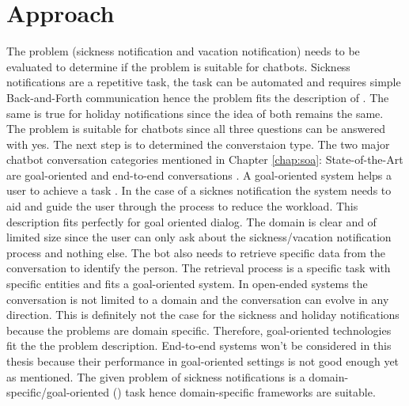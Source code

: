 
\section{Approach}
The problem (sickness notification and vacation notification) needs to be evaluated to determine if the problem is suitable for chatbots.
Sickness notifications are a repetitive task, the task can be automated and requires simple Back-and-Forth communication hence the problem fits the description of \citet{buiildChatbotsPython}.
The same is true for holiday notifications since the idea of both remains the same.
The problem is suitable for chatbots since all three questions can be answered with yes.
The next step is to determined the converstaion type.
The two major chatbot conversation categories mentioned in Chapter \ref{chap:soa}: State-of-the-Art are goal-oriented 
and end-to-end conversations \cite{williams2017hybrid, bordes2016learning, rahman2017programming}.
A goal-oriented system helps a user to achieve a task \cite{rahman2017programming}.
In the case of a sicknes notification the system needs to aid and guide the user through the process to reduce the workload.
This description fits perfectly for goal oriented dialog.
The domain is clear and of limited size since the user can only ask about the sickness/vacation notification process and nothing else.
The bot also needs to retrieve specific data from the conversation to identify the person.
The retrieval process is a specific task with specific entities and fits a goal-oriented system.
In open-ended systems the conversation is not limited to a domain and the conversation can evolve in any direction.
This is definitely not the case for the sickness and holiday notifications because the problems are domain specific.
Therefore, goal-oriented technologies fit the the problem description.
End-to-end systems won't be considered in this thesis because their performance in goal-oriented settings is not good enough yet as 
\citet{bordes2016learning} mentioned.
The given problem of sickness notifications is a domain-specific/goal-oriented 
(\citet{deshpande2017survey, luis2015williams, braunEvaluatingNLU, williams2017hybrid}) 
task hence domain-specific frameworks are suitable.

